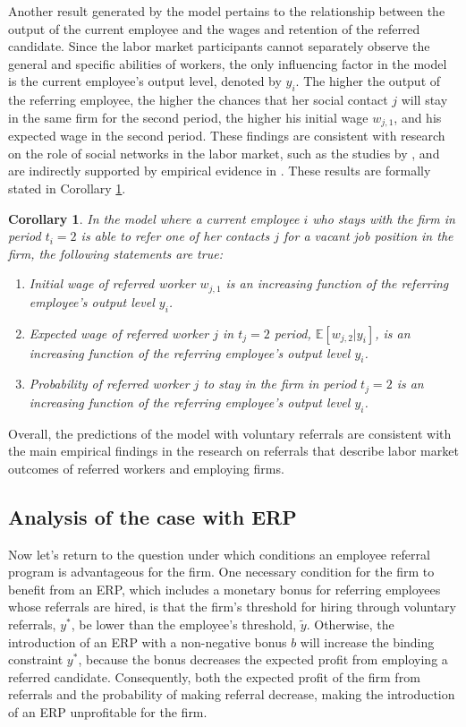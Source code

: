 \documentclass[12pt]{article}
\newtheorem{corollary}[theorem]{Corollary}
\begin{document}
Another result generated by the model pertains to the relationship between the output of the current employee and the wages and retention of the referred candidate. Since the labor market participants cannot separately observe the general and specific abilities of workers, the only influencing factor in the model is the current employee's output level, denoted by $y_i$. The higher the output of the referring employee, the higher the chances that her social contact $j$ will stay in the same firm for the second period, the higher his initial wage $w_{j,1}$, and his expected wage in the second period. These findings are consistent with research on the role of social networks in the labor market, such as the studies by \cite{saloner1985old, simon1992matchmaker}, and are indirectly supported by empirical evidence in \cite{pallais2016referential, lalanne2016old, levati2020impact}. These results are formally stated in Corollary \ref{cor:relation_current_empl}.
\begin{corollary}\label{cor:relation_current_empl}
    In the model where a current employee $i$ who stays with the firm in period $t_i = 2$ is able to refer one of her contacts $j$ for a vacant job position in the firm, the following statements are true:
    \begin{enumerate}[label={\roman*})]
        \item Initial wage of referred worker $w_{j,1}$ is an increasing function of the referring employee's output level $y_i$.
        \item Expected wage of referred worker $j$ in $t_j = 2$ period,  $\mathbb{E}[w_{j,2}|y_i]$, is an increasing function of the referring employee's output level $y_i$.
        \item Probability of referred worker $j$ to stay in the firm in period $t_j = 2$ is an increasing function of the referring employee's output level $y_i$.
    \end{enumerate}
\end{corollary}

Overall, the predictions of the model with voluntary referrals are consistent with the main empirical findings in the research on referrals that describe labor market outcomes of referred workers and employing firms. 

\subsection{Analysis of the case with ERP}

Now let's return to the question under which conditions an employee referral program is advantageous for the firm. One necessary condition for the firm to benefit from an ERP, which includes a monetary bonus for referring employees whose referrals are hired, is that the firm's threshold for hiring through voluntary referrals, $y^*$, be lower than the employee's threshold, $\tilde{y}$. Otherwise, the introduction of an ERP with a non-negative bonus $b$ will increase the binding constraint $y^*$, because the bonus decreases the expected profit from employing a referred candidate. Consequently, both the expected profit of the firm from referrals and the probability of making referral decrease, making the introduction of an ERP unprofitable for the firm.
\end{document}
